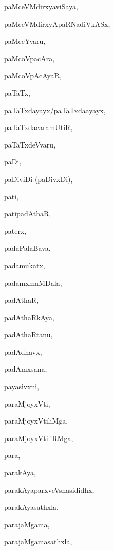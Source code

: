 \begin{multicols}{2}
{paMceVMdirxyaviSaya}, \pageref{paMceVMdirxyaviSaya}

{paMceVMdirxyApaRNadiVkASx}, \pageref{paMceVMdirxyApaRNadiVkASx}

{paMceYvaru}, \pageref{paMceYvaru}

{paMcoVpacAra}, \pageref{paMcoVpacAra}

{paMcoVpAcAyaR}, \pageref{paMcoVpAcAyaR}

{paTaTx}, \pageref{paTaTx}

{paTaTxdayayx/paTaTxda{a}yayx}, \pageref{paTaTxdayayxpaTaTxdaayayx}

{paTaTxdacaramUtiR}, \pageref{paTaTxdacaramUtiR}

{paTaTxdeVvaru}, \pageref{paTaTxdeVvaru}

{paDi}, \pageref{paDi}

{paDiviDi (paDivxDi)}, \pageref{paDiviDipaDivxDi}

{pati}, \pageref{pati}

{patipadAthaR}, \pageref{patipadAthaR}

{paterx}, \pageref{paterx}

{padaPalaBava}, \pageref{padaPalaBava}

{padamukatx}, \pageref{padamukatx}

{padamxmaMDala}, \pageref{padamxmaMDala}

{padAthaR}, \pageref{padAthaR}

{padAthaRkAya}, \pageref{padAthaRkAya}

{padAthaRtanu}, \pageref{padAthaRtanu}

{padAdhavx}, \pageref{padAdhavx}

{padAmxsana}, \pageref{padAmxsana}

{payasivxni}, \pageref{payasivxni}

{paraMjoyxVti}, \pageref{paraMjoyxVti}

{paraMjoyxVtiliMga}, \pageref{paraMjoyxVtiliMga}

{paraMjoyxVtiliRMga}, \pageref{paraMjoyxVtiliRMga}

{para}, \pageref{para}

{parakAya}, \pageref{parakAya}

{parakAyaparxveVshasididhx}, \pageref{parakAyaparxveVshasididhx}

{parakAyasathxla}, \pageref{parakAyasathxla}

{parajaMgama}, \pageref{parajaMgama}

{parajaMgamasathxla}, \pageref{parajaMgamasathxla}


\end{multicols}

